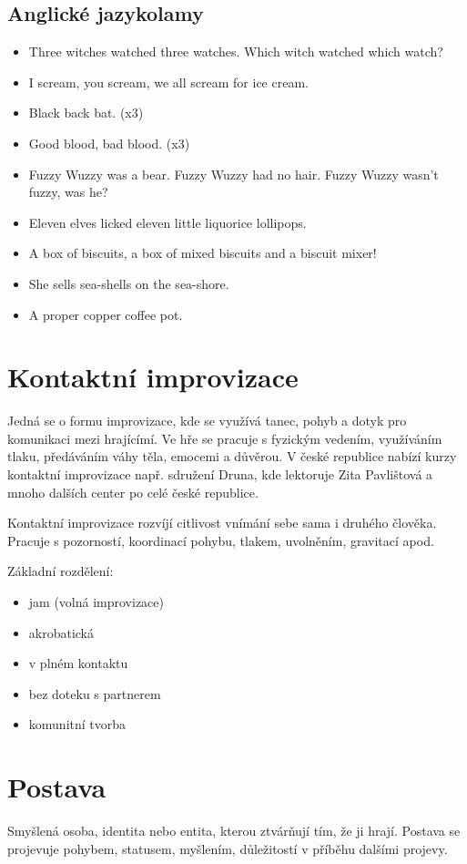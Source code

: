 \documentclass[main.tex]{subfiles}
\begin{document}
\subsection{ Anglické jazykolamy }  
\begin{itemize}
\item  Three witches watched three watches. Which witch watched which watch?
\item  I scream, you scream, we all scream for ice cream.
\item  Black back bat. (x3)
\item  Good blood, bad blood. (x3)
\item  Fuzzy Wuzzy was a bear. Fuzzy Wuzzy had no hair. Fuzzy Wuzzy wasn’t fuzzy, was he?
\item  Eleven elves licked eleven little liquorice lollipops.
\item  A box of biscuits, a box of mixed biscuits and a biscuit mixer!
\item  She sells sea-shells on the sea-shore.
\item  A proper copper coffee pot.
\end{itemize}
 
 
\needspace{5cm} \section{Kontaktní improvizace} \label{kontaktní improvizace} Jedná se o formu improvizace, kde se využívá tanec, pohyb a dotyk pro komunikaci mezi hrajícímí. Ve hře se pracuje s fyzickým vedením, využíváním tlaku, předáváním váhy těla, emocemi a důvěrou. V české republice nabízí  kurzy kontaktní improvizace např. sdružení Druna, kde lektoruje Zita Pavlištová a mnoho dalších center po celé české republice. 
 
Kontaktní improvizace rozvíjí citlivost vnímání sebe sama i druhého člověka. Pracuje s pozorností, koordinací pohybu, tlakem, uvolněním, gravitací apod. 
 
Základní rozdělení: 
 
\begin{itemize}
\item  jam (volná improvizace)
\item  akrobatická
\item  v plném kontaktu
\item  bez doteku s partnerem
\item  komunitní tvorba
\end{itemize}
 
\needspace{5cm} \section{Postava} \label{postava} Smyšlená osoba, identita nebo entita, kterou ztvárňují  tím, že ji hrají. Postava se projevuje pohybem, statusem, myšlením, důležitostí v příběhu dalšími projevy. 
 
\end{document}
